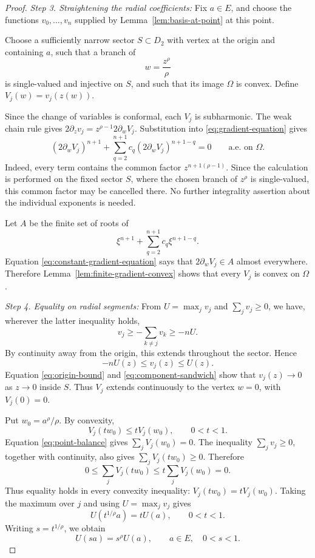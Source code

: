 \documentclass[12pt,letterpaper,reqno]{amsart}
\theoremstyle{definition}
\numberwithin{equation}{section}
\begin{document}
\begin{proof}
\medskip\noindent
\emph{{Step 3. Straightening the radial coefficients:}}
Fix \(a\in E\), and choose the functions
\(v_0,\ldots,v_{n}\) supplied by
Lemma~\ref{lem:basis-at-point} at this point.

Choose a sufficiently narrow sector \(S\subset D_2\) with vertex at
the origin and containing \(a\), such that a branch of
\[
w=\frac{z^\rho}{\rho}
\]
is single-valued and injective on \(S\), and such that its image
\(\Omega\) is convex. Define
\(V_j(w)=v_j(z(w))\).

Since the change of variables is conformal, each \(V_j\) is
subharmonic. The weak chain rule gives
\(2\partial_zv_j=z^{\rho-1}2\partial_wV_j\).
Substitution into \eqref{eq:gradient-equation} gives
\begin{equation}\label{eq:constant-gradient-equation}
 (2\partial_wV_j)^{n+1}
 +
 \sum_{q=2}^{n+1}
 c_q(2\partial_wV_j)^{{n+1}-q}
 =
 0
 \qquad\text{a.e.\ on }\Omega.
\end{equation}
Indeed, every term contains the common factor
\(z^{{n+1}(\rho-1)}\). Since the calculation is performed on the fixed
sector \(S\), where the chosen branch of \(z^\rho\) is single-valued,
this common factor may be cancelled there. No further integrality
assertion about the individual exponents is needed.

Let \(A\) be the finite set of roots of
\[
\xi^{n+1}+\sum_{q=2}^{n+1}c_q\xi^{{n+1}-q}.
\]
Equation \eqref{eq:constant-gradient-equation} says that
\(2\partial_wV_j\in A\) almost everywhere. Therefore
Lemma~\ref{lem:finite-gradient-convex} shows that every \(V_j\) is
convex on \(\Omega\).


\medskip\noindent
\emph{{Step 4. Equality on radial segments:}}
From \(U=\max_jv_j\) and
\(\sum_jv_j\geq0\), we have, wherever the latter inequality holds,
\[
v_j
\geq
-\sum_{k\ne j}v_k
\geq
-nU.
\]
By continuity away from the origin, this extends throughout the
sector. Hence
\begin{equation}\label{eq:component-sandwich}
 -nU(z)
 \leq
 v_j(z)
 \leq
 U(z).
\end{equation}
Equation \eqref{eq:origin-bound} and
\eqref{eq:component-sandwich} show that
\(v_j(z)\to0\) as \(z\to0\) inside \(S\). Thus \(V_j\) extends
continuously to the vertex \(w=0\), with \(V_j(0)=0\).

Put \(w_0=a^\rho/\rho\). By convexity,
\[
V_j(tw_0)
\leq
tV_j(w_0),
\qquad
0<t<1.
\]
Equation \eqref{eq:point-balance} gives
\(\sum_jV_j(w_0)=0\). The inequality
\(\sum_jv_j\geq0\), together with continuity, also gives
\(\sum_jV_j(tw_0)\geq0\). Therefore
\[
0
\leq
\sum_jV_j(tw_0)
\leq
t\sum_jV_j(w_0)
=
0.
\]
Thus equality holds in every convexity inequality:
\(V_j(tw_0)=tV_j(w_0)\). Taking the maximum over \(j\) and using
\(U=\max_jv_j\) gives
\[
U(t^{1/\rho}a)=tU(a),
\qquad
0<t<1.
\]
Writing \(s=t^{1/\rho}\), we obtain
\begin{equation}\label{eq:homogeneity-on-E}
 U(sa)=s^\rho U(a),
 \qquad
 a\in E,\quad 0<s<1.
\end{equation}


\end{proof}
\end{document}
